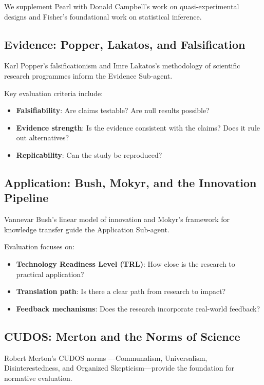 \documentclass[11pt,a4paper]{article}
\begin{document}
We supplement Pearl with Donald Campbell's work on quasi-experimental designs \citep{campbell1963experimental} and Fisher's foundational work on statistical inference.

\subsection{Evidence: Popper, Lakatos, and Falsification}

Karl Popper's falsificationism \citep{popper1934logic} and Imre Lakatos's methodology of scientific research programmes \citep{lakatos1970falsification} inform the Evidence Sub-agent.

Key evaluation criteria include:
\begin{itemize}
    \item \textbf{Falsifiability}: Are claims testable? Are null results possible?
    \item \textbf{Evidence strength}: Is the evidence consistent with the claims? Does it rule out alternatives?
    \item \textbf{Replicability}: Can the study be reproduced?
\end{itemize}

\subsection{Application: Bush, Mokyr, and the Innovation Pipeline}

Vannevar Bush's linear model of innovation \citep{bush1945science} and Mokyr's framework for knowledge transfer \citep{mokyr2002gifts} guide the Application Sub-agent.

Evaluation focuses on:
\begin{itemize}
    \item \textbf{Technology Readiness Level (TRL)}: How close is the research to practical application?
    \item \textbf{Translation path}: Is there a clear path from research to impact?
    \item \textbf{Feedback mechanisms}: Does the research incorporate real-world feedback?
\end{itemize}

\subsection{CUDOS: Merton and the Norms of Science}

Robert Merton's CUDOS norms \citep{merton1942normative}---Communalism, Universalism, Disinterestedness, and Organized Skepticism---provide the foundation for normative evaluation.
\end{document}
